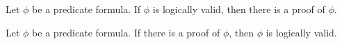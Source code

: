 \begin{theorem}
  Let $\phi$ be a predicate formula. If $\phi$ is logically valid, then
  there is a proof of $\phi$.
\end{theorem}

\begin{theorem}
  Let $\phi$ be a predicate formula. If there is a proof of $\phi$, then
  $\phi$ is logically valid.
\end{theorem}
